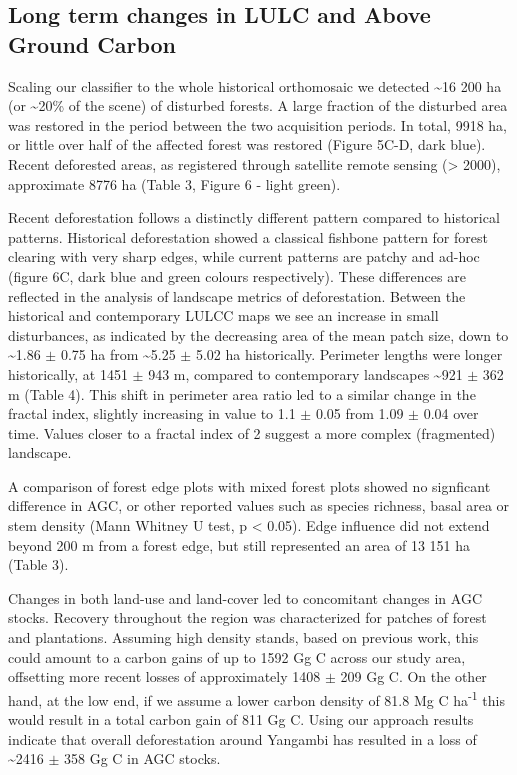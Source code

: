 \documentclass[remote sensing,article,submit,moreauthors,pdftex]{mdpi}
\begin{document}
\hypertarget{long-term-changes-in-lulc-and-above-ground-carbon}{%
\subsection{Long term changes in LULC and Above Ground
Carbon}\label{long-term-changes-in-lulc-and-above-ground-carbon}}

Scaling our classifier to the whole historical orthomosaic we detected
\textasciitilde{}16 200 ha (or \textasciitilde{}20\% of the scene) of
disturbed forests. A large fraction of the disturbed area was restored
in the period between the two acquisition periods. In total, 9918 ha, or
little over half of the affected forest was restored (Figure 5C-D, dark
blue). Recent deforested areas, as registered through satellite remote
sensing (\textgreater{} 2000), approximate 8776 ha (Table 3, Figure 6 -
light green).

Recent deforestation follows a distinctly different pattern compared to
historical patterns. Historical deforestation showed a classical
fishbone pattern for forest clearing with very sharp edges, while
current patterns are patchy and ad-hoc (figure 6C, dark blue and green
colours respectively). These differences are reflected in the analysis
of landscape metrics of deforestation. Between the historical and
contemporary LULCC maps we see an increase in small disturbances, as
indicated by the decreasing area of the mean patch size, down to
\textasciitilde{}1.86 \(\pm\) 0.75 ha from \textasciitilde{}5.25 \(\pm\)
5.02 ha historically. Perimeter lengths were longer historically, at
1451 \(\pm\) 943 m, compared to contemporary landscapes
\textasciitilde{}921 \(\pm\) 362 m (Table 4). This shift in perimeter
area ratio led to a similar change in the fractal index, slightly
increasing in value to 1.1 \(\pm\) 0.05 from 1.09 \(\pm\) 0.04 over
time. Values closer to a fractal index of 2 suggest a more complex
(fragmented) landscape.

A comparison of forest edge plots with mixed forest plots showed no
signficant difference in AGC, or other reported values such as species
richness, basal area or stem density (Mann Whitney U test, p \textless{}
0.05). Edge influence did not extend beyond 200 m from a forest edge,
but still represented an area of 13 151 ha (Table 3).

Changes in both land-use and land-cover led to concomitant changes in
AGC stocks. Recovery throughout the region was characterized for patches
of forest and plantations. Assuming high density stands, based on
previous work, this could amount to a carbon gains of up to 1592 Gg C
across our study area, offsetting more recent losses of approximately
1408 \(\pm\) 209 Gg C. On the other hand, at the low end, if we assume a
lower carbon density of 81.8 Mg C ha\textsuperscript{-1} this would
result in a total carbon gain of 811 Gg C. Using our approach results
indicate that overall deforestation around Yangambi has resulted in a
loss of \textasciitilde{}2416 \(\pm\) 358 Gg C in AGC stocks.
\end{document}

